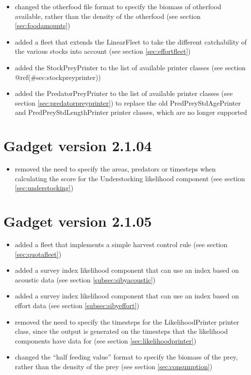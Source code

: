 \documentclass[]{book}
\providecommand{\tightlist}{%
  \setlength{\itemsep}{0pt}\setlength{\parskip}{0pt}}
\begin{document}
\begin{itemize}
\item
  changed the otherfood file format to specify the biomass of
  otherfood available, rather than the density of the otherfood (see
  section \ref{sec:foodamounts})
\item
  added a fleet that extends the LinearFleet to take the different
  catchability of the various stocks into account (see
  section \ref{sec:effortfleet})
\item
  added the StockPreyPrinter to the list of available printer classes
  (see section @ref(\#sec:stockpreyprinter))
\item
  added the PredatorPreyPrinter to the list of available printer
  classes (see section \ref{sec:predatorpreyprinter}) to replace the old
  PredPreyStdAgePrinter and PredPreyStdLengthPrinter printer classes,
  which are no longer supported
\end{itemize}

\hypertarget{sec:v2104}{%
\section{Gadget version 2.1.04}\label{sec:v2104}}

\begin{itemize}
\tightlist
\item
  removed the need to specify the areas, predators or timesteps when
  calculating the score for the Understocking likelihood component
  (see section \ref{sec:understocking})
\end{itemize}

\hypertarget{sec:v2105}{%
\section{Gadget version 2.1.05}\label{sec:v2105}}

\begin{itemize}
\item
  added a fleet that implements a simple harvest control rule (see
  section \ref{sec:quotafleet})
\item
  added a survey index likelihood component that can use an index
  based on acoustic data (see
  section \ref{subsec:sibyacoustic})
\item
  added a survey index likelihood component that can use an index
  based on effort data (see
  section \ref{subsec:sibyeffort})
\item
  removed the need to specify the timesteps for the LikelihoodPrinter
  printer class, since the output is generated on the timesteps that
  the likelihood components have data for (see
  section \ref{sec:likelihoodprinter})
\item
  changed the ``half feeding value'' format to specify the biomass of
  the prey, rather than the density of the prey (see
  section \ref{sec:consumption})
\end{itemize}
\end{document}

